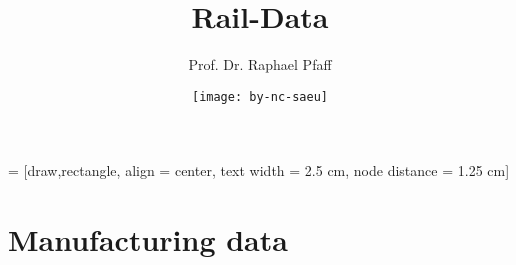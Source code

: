 \documentclass[10pt,slidestop,compress,mathserif]{beamer}
\begin{document}
 = [draw,rectangle, align = center, text width = 2.5 cm, node distance = 1.25 cm]

\newcommand{\Var}{\operatorname{Var}}
\newcommand{\mum}{\operatorname{\mu m}}
\newcommand{\E}{\operatorname{E}}
\newcommand{\offslide}[2]{\frame{\frametitle{ \includegraphics[scale=0.01] {Off}\hspace{1.5mm} #1}
\framesubtitle{#2}
}}
\newcommand{\source}[1]{\rotatebox{90}{\tiny \color{gray} #1}}

\title{Rail-Data}
\author[R. Pfaff]{Prof. Dr. Raphael Pfaff}
\date{\texttt{[image: by-nc-saeu]}}
\begin{frame} %
\titlepage
\end{frame}

%




%

%
%







\section{Manufacturing data}

% 
% 
% 


\end{document}
